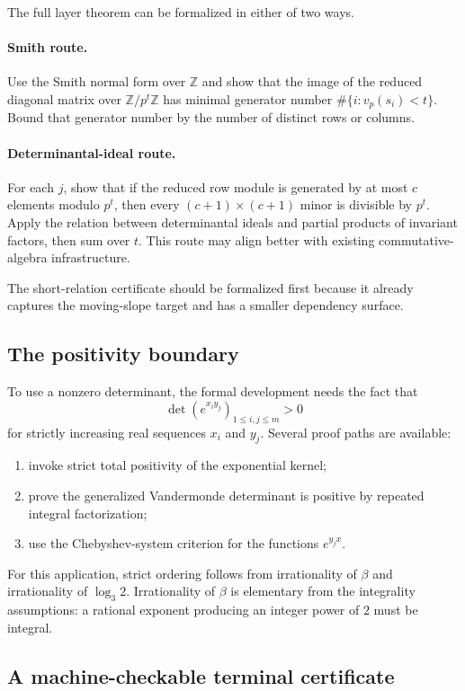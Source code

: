 \documentclass[11pt]{article}
\theoremstyle{definition}
\theoremstyle{remark}
\newcommand{\Z}{\mathbb Z}
\begin{document}
The full layer theorem can be formalized in either of two ways.

\paragraph{Smith route.}
Use the Smith normal form over $\Z$ and show that the image of the reduced diagonal matrix over $\Z/p^t\Z$ has minimal generator number
$\#\{i:v_p(s_i)<t\}$.  Bound that generator number by the number of distinct rows or columns.

\paragraph{Determinantal-ideal route.}
For each $j$, show that if the reduced row module is generated by at most $c$ elements modulo $p^t$, then every $(c+1)\times(c+1)$ minor is divisible by $p^t$.  Apply the relation between determinantal ideals and partial products of invariant factors, then sum over $t$.  This route may align better with existing commutative-algebra infrastructure.

The short-relation certificate should be formalized first because it already captures the moving-slope target and has a smaller dependency surface.

\subsection{The positivity boundary}

To use a nonzero determinant, the formal development needs the fact that
\[
 \det(e^{x_i y_j})_{1\le i,j\le m}>0
\]
for strictly increasing real sequences $x_i$ and $y_j$.  Several proof paths are available:
\begin{enumerate}[label=\textup{(P\arabic*)}]
\item invoke strict total positivity of the exponential kernel;
\item prove the generalized Vandermonde determinant is positive by repeated integral factorization;
\item use the Chebyshev-system criterion for the functions $e^{y_jx}$.
\end{enumerate}
For this application, strict ordering follows from irrationality of $\beta$ and irrationality of $\log_3 2$.  Irrationality of $\beta$ is elementary from the integrality assumptions: a rational exponent producing an integer power of $2$ must be integral.

\subsection{A machine-checkable terminal certificate}
\end{document}
